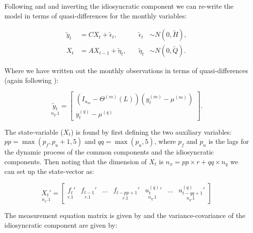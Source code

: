 \documentclass[12pt]{article}
\begin{document}
\begin{appendices}

Following \cite{DurbinKoopman2012} and \cite{Harvey1989} and inverting the idiosyncratic component we can re-write the model in terms of quasi-differences for the monthly variables:

\begin{equation}
\begin{aligned}
\widetilde{y}_{t} 	&= C X_{t} + \tilde{\epsilon}_{t},	\quad &\tilde{\epsilon}_{t} 		&\sim N(0, \widetilde{H}),\\
X_{t} 			&= A X_{t-1} + \tilde{\eta}_{t},		\quad &\tilde{\eta}_{t} 	&\sim N(0, \widetilde{Q}).
\end{aligned}
\end{equation}

Where we have written out the monthly observations in terms of quasi-differences (again following \cite{AntolinDiazDrechselPetrella2016}):

\begin{equation*}
\underset{n_{y}.1}{\widetilde{y}_{t}} =
\begin{bmatrix}
\left(I_{n_{m}} - \Theta^{(m)}(L)\right)\left(y_{t}^{(m)} - \mu^{(m)}\right)\\
y_{t}^{(q)} - \mu^{(q)}
\end{bmatrix}.
\end{equation*}

The state-variable ($X_{t}$) is found by first defining the two auxiliary variables: $pp =\max(p_{f}, p_{u}+1, 5)$ and $qq=\max(p_{u}, 5)$, where $p_{f}$ and $p_{u}$ is the lags for the dynamic process of the common components and the idiosyncratic components.
Then noting that the dimension of $X_{t}$ is $n_{x} = pp \times r + qq \times n_{q}$ we can set up the state-vector as:

\begin{equation*}
\underset{n_{x}.1}{X_{t}'} =
\begin{bmatrix}
\underset{r.1}{f_{t}}' 				&
\underset{r.1}{f_{t-1}}'			&
\dots								&
\underset{r.1}{f_{t-pp + 1}}'		&
\underset{n_{q}.1}{u_{t}^{(q)}}'	&
\dots								&
\underset{n_{q}.1}{u_{t-qq+1}^{(q)}}'
\end{bmatrix}
\end{equation*}

The measurement equation matrix is given by and the variance-covariance of the idiosyncratic component are given by:


\end{appendices}
\end{document}
